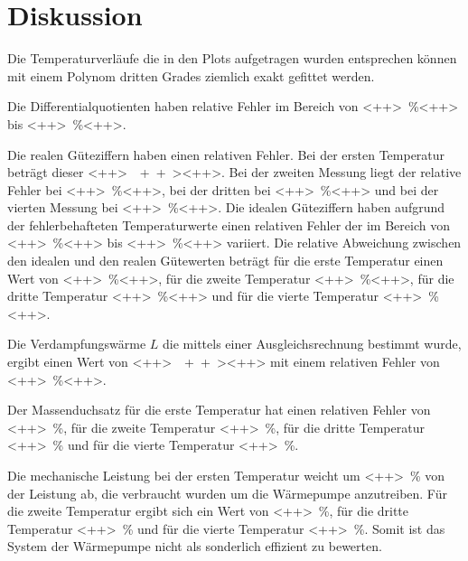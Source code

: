 \section{Diskussion}
\label{sec:Diskussion}

Die Temperaturverläufe die in den Plots aufgetragen wurden entsprechen können mit einem 
Polynom dritten Grades ziemlich exakt gefittet werden. 

Die Differentialquotienten haben relative Fehler im Bereich von \SI{<++>}{\percent}<++> 
bis \SI{<++>}{\percent}<++>. 

Die realen Güteziffern haben einen relativen Fehler. Bei der ersten Temperatur beträgt 
dieser \SI{<++>}{\<++>}<++>. Bei der zweiten Messung liegt der relative Fehler bei 
\SI{<++>}{\percent}<++>, bei der dritten bei \SI{<++>}{\percent}<++> und bei der 
vierten Messung bei \SI{<++>}{\percent}<++>. 
Die idealen Güteziffern haben aufgrund der fehlerbehafteten Temperaturwerte einen 
relativen Fehler der im Bereich von \SI{<++>}{\percent}<++> bis \SI{<++>}{\percent}<++> 
variiert. 
Die relative Abweichung zwischen den idealen und den realen Gütewerten beträgt für die 
erste Temperatur einen Wert von \SI{<++>}{\percent}<++>, für die zweite Temperatur 
\SI{<++>}{\percent}<++>, für die dritte Temperatur \SI{<++>}{\percent}<++> und für die 
vierte Temperatur \SI{<++>}{\percent}<++>.

\noindent Die Verdampfungswärme $L$ die mittels einer Ausgleichsrechnung bestimmt wurde, 
ergibt einen Wert von \SI{<++>}{\<++>}<++> mit einem relativen Fehler von 
\SI{<++>}{\percent}<++>. 

\noindent Der Massenduchsatz für die erste Temperatur hat einen relativen Fehler von 
\SI{<++>}{\percent}, für die zweite Temperatur \SI{<++>}{\percent}, für die dritte 
Temperatur \SI{<++>}{\percent} und für die vierte Temperatur \SI{<++>}{\percent}. 

\noindent Die mechanische Leistung bei der ersten Temperatur weicht um 
\SI{<++>}{\percent} von der Leistung ab, die verbraucht wurden um die Wärmepumpe 
anzutreiben. Für die zweite Temperatur ergibt sich ein Wert von \SI{<++>}{\percent}, 
für die dritte Temperatur \SI{<++>}{\percent} und für die vierte Temperatur 
\SI{<++>}{\percent}. 
Somit ist das System der Wärmepumpe nicht als sonderlich effizient zu bewerten.